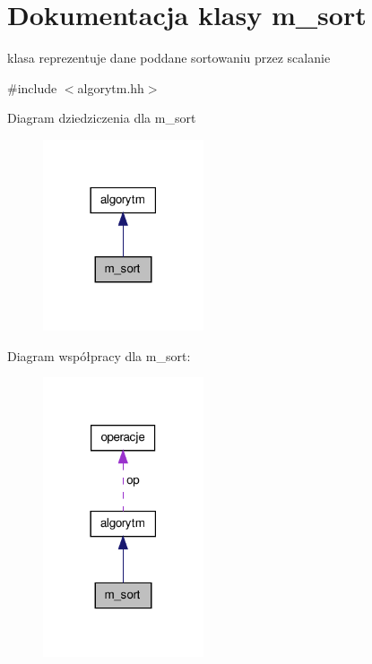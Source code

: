 \hypertarget{classm__sort}{\section{\-Dokumentacja klasy m\-\_\-sort}
\label{classm__sort}
}


klasa reprezentuje dane poddane sortowaniu przez scalanie  




{\ttfamily \#include $<$algorytm.\-hh$>$}



\-Diagram dziedziczenia dla m\-\_\-sort\nopagebreak
\begin{figure}[H]
\begin{center}
\leavevmode
\includegraphics[width=134pt]{classm__sort__inherit__graph}
\end{center}
\end{figure}


\-Diagram współpracy dla m\-\_\-sort\-:\nopagebreak
\begin{figure}[H]
\begin{center}
\leavevmode
\includegraphics[width=134pt]{classm__sort__coll__graph}
\end{center}
\end{figure}
